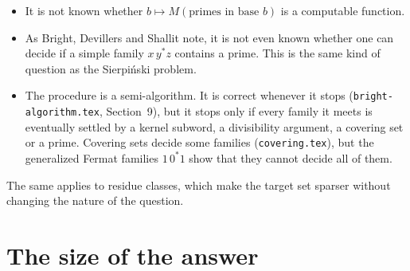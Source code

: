 \documentclass[11pt]{article}
\theoremstyle{remark}
\newcommand{\code}[1]{\texttt{#1}}
\begin{document}
\begin{itemize}
\item It is not known whether $b\mapsto M(\text{primes in base } b)$ is a computable function.
\item As Bright, Devillers and Shallit note, it is not even known whether one can decide if a simple family $x\,y^*z$ contains a prime. This is the same kind of question as the Sierpi\'nski problem.
\item The procedure is a semi-algorithm. It is correct whenever it stops (\code{bright-algorithm.tex}, Section~9), but it stops only if every family it meets is eventually settled by a kernel subword, a divisibility argument, a covering set or a prime. Covering sets decide some families (\code{covering.tex}), but the generalized Fermat families $1\,0^*1$ show that they cannot decide all of them.
\end{itemize}

The same applies to residue classes, which make the target set sparser without changing the nature of the question.

\section{The size of the answer}
\end{document}

